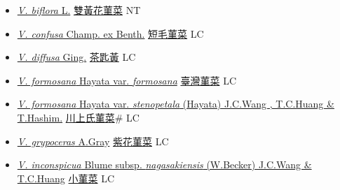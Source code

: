 \begin{itemize}
\begin{itemize}
        \item[] \href{http://www.theplantlist.org/tpl1.1/search?q=Viola+biflora}{\textit{V. biflora} L.}   \href{\detokenize{http://taibnet.sinica.edu.tw/chi/taibnet_species_list.php?T2=雙黃花菫菜&T2_new_value=true&fr=y}}{雙黃花菫菜} NT
        \item[] \href{http://www.theplantlist.org/tpl1.1/search?q=Viola+confusa}{\textit{V. confusa} Champ. ex Benth.}   \href{\detokenize{http://taibnet.sinica.edu.tw/chi/taibnet_species_list.php?T2=短毛菫菜&T2_new_value=true&fr=y}}{短毛菫菜} LC
        \item[] \href{http://www.theplantlist.org/tpl1.1/search?q=Viola+diffusa}{\textit{V. diffusa} Ging.}   \href{\detokenize{http://taibnet.sinica.edu.tw/chi/taibnet_species_list.php?T2=茶匙黃&T2_new_value=true&fr=y}}{茶匙黃} LC
        \item[] \href{http://www.theplantlist.org/tpl1.1/search?q=Viola+formosana+var.+formosana}{\textit{V. formosana} Hayata var. \textit{formosana}}   \href{\detokenize{http://taibnet.sinica.edu.tw/chi/taibnet_species_list.php?T2=臺灣菫菜&T2_new_value=true&fr=y}}{臺灣菫菜} LC
        \item[] \href{http://www.theplantlist.org/tpl1.1/search?q=Viola+formosana+var.+stenopetala}{\textit{V. formosana} Hayata var. \textit{stenopetala} (Hayata) J.C.Wang , T.C.Huang \& T.Hashim.}   \href{\detokenize{http://taibnet.sinica.edu.tw/chi/taibnet_species_list.php?T2=川上氏菫菜&T2_new_value=true&fr=y}}{川上氏菫菜}\# LC
        \item[] \href{http://www.theplantlist.org/tpl1.1/search?q=Viola+grypoceras}{\textit{V. grypoceras} A.Gray}   \href{\detokenize{http://taibnet.sinica.edu.tw/chi/taibnet_species_list.php?T2=紫花菫菜&T2_new_value=true&fr=y}}{紫花菫菜} LC
        \item[] \href{http://www.theplantlist.org/tpl1.1/search?q=Viola+inconspicua+subsp.+nagasakiensis}{\textit{V. inconspicua} Blume subsp. \textit{nagasakiensis} (W.Becker) J.C.Wang \& T.C.Huang}   \href{\detokenize{http://taibnet.sinica.edu.tw/chi/taibnet_species_list.php?T2=小菫菜&T2_new_value=true&fr=y}}{小菫菜} LC

\end{itemize}
\end{itemize}
